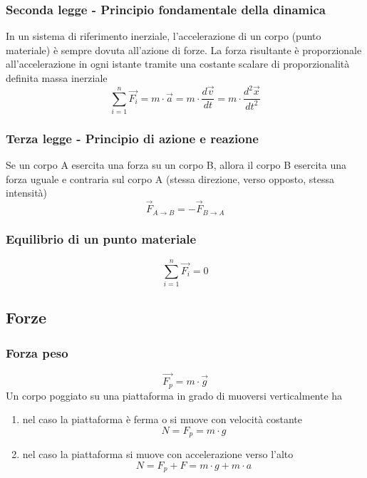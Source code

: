\documentclass[twoside]{article}
\begin{document}
\subsubsection{Seconda legge - Principio fondamentale della dinamica}
In un sistema di riferimento inerziale, l’accelerazione di un corpo (punto materiale) è sempre
dovuta all’azione di forze. La forza risultante è proporzionale all’accelerazione in ogni
istante tramite una costante scalare di proporzionalità definita massa inerziale
\begin{equation}
  \boxed{\sum_{i=1}^{n} \vec{F_i} = m \cdot \vec{a} = m \cdot \frac{d\vec{v}}{dt} = m \cdot \frac{d^2\vec{x}}{dt^2}}
\end{equation}
\subsubsection{Terza legge - Principio di azione e reazione}
Se un corpo A esercita una forza su un corpo B, allora il corpo B esercita una forza uguale e
contraria sul corpo A (stessa direzione, verso opposto, stessa intensità)
\begin{equation}
  \boxed{\vec{F}_{A \rightarrow B} = - \vec{F}_{B \rightarrow A}}
\end{equation}

\subsubsection{Equilibrio di un punto materiale}
\begin{equation}
  \boxed{\sum_{i=1}^{n} \vec{F_i} = 0}
\end{equation}

\subsection{Forze}
\subsubsection{Forza peso}
\begin{equation}
  \boxed{\vec{F_p} = m \cdot \vec{g}}
\end{equation}
Un corpo poggiato su una piattaforma in grado di muoversi verticalmente ha
\begin{enumerate}
  \item nel caso la piattaforma è ferma o si muove con velocità costante
        \begin{equation*}
          N = F_p = m \cdot g
        \end{equation*}
  \item nel caso la piattaforma si muove con accelerazione verso l’alto
        \begin{equation*}
          N = F_p + F = m \cdot g + m \cdot a
        \end{equation*}
\end{enumerate}
\end{document}
